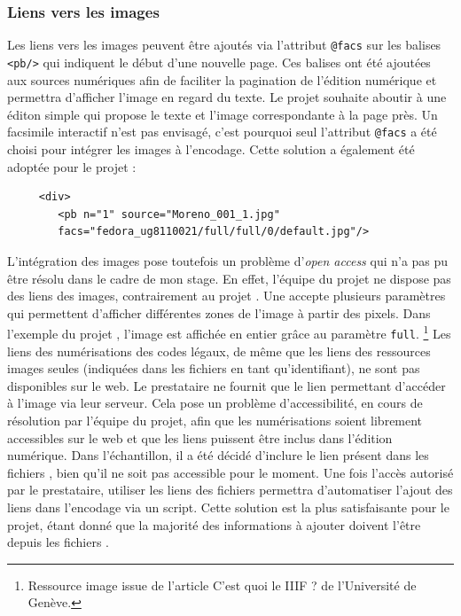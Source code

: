 \subsubsection{Liens vers les images}
Les liens vers les images peuvent être ajoutés via l'attribut \texttt{@facs} sur les balises \texttt{<pb/>} qui indiquent le début d'une nouvelle page. Ces balises ont été ajoutées aux sources numériques afin de faciliter la pagination de l'édition numérique et permettra d'afficher l'image en regard du texte. Le projet \COREL souhaite aboutir à une éditon simple qui propose le texte et l'image correspondante à la page près. Un facsimile interactif n'est pas envisagé, c'est pourquoi seul l'attribut \texttt{@facs} a été choisi pour intégrer les images à l'encodage. Cette solution a également été adoptée pour le projet \cordel : 
\begin{verbatim}
     <div>
        <pb n="1" source="Moreno_001_1.jpg" 
        facs="fedora_ug8110021/full/full/0/default.jpg"/>
\end{verbatim}

L'intégration des images pose toutefois un problème d'\textit{open access} qui n'a pas pu être résolu dans le cadre de mon stage. En effet, l'équipe du projet ne dispose pas des liens \IIIF des images, contrairement au projet \cordel. Une \URL \IIIF accepte plusieurs paramètres qui permettent d'afficher différentes zones de l'image à partir des pixels. Dans l'exemple du projet \cordel, l'image est affichée en entier grâce au paramètre \texttt{full}. \footnote{Ressource image issue de l'article \og C'est quoi le IIIF ? \fg de l'Université de Genève.} Les liens \IIIF des numérisations des codes légaux, de même que les liens des ressources images seules (indiquées dans les fichiers \JSON en tant qu'identifiant), ne sont pas disponibles sur le web. Le prestataire ne fournit que le lien permettant d'accéder à l'image via leur serveur. Cela pose un problème d'accessibilité, en cours de résolution par l'équipe du projet, afin que les numérisations soient librement accessibles sur le web et que les liens puissent être inclus dans l'édition numérique. Dans l'échantillon, il a été décidé d'inclure le lien présent dans les fichiers \JSON, bien qu'il ne soit pas accessible pour le moment. Une fois l'accès autorisé par le prestataire, utiliser les liens des fichiers \JSON permettra d'automatiser l'ajout des liens dans l'encodage via un script. Cette solution est la plus satisfaisante pour le projet, étant donné que la majorité des informations à ajouter doivent l'être depuis les fichiers \JSON. 

